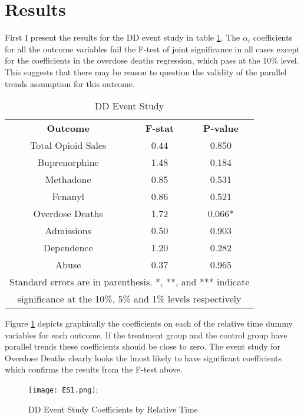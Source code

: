 \documentclass[11pt]{article}
\begin{document}
\section{Results}

First I present the results for the DD event study in table \ref{DD Event Study}.  The $\alpha_i$ coefficients for all the outcome variables fail the F-test of joint significance in all cases except for the coefficients in the overdose deaths regression, which pass at the 10\% level.  This suggests that there may be reason to question the validity of the parallel trends assumption for this outcome.   

\begin{table}[htb]
\centering
\scriptsize
\caption{DD Event Study} 
\label{DD Event Study}
\begin{tabular}{ccc}
\hline \hline
 \textbf{Outcome} & \textbf{F-stat} & \textbf{P-value} \\
Total Opioid Sales &0.44 & 0.850 \\
Buprenorphine & 1.48 & 0.184 \\
Methadone &0.85 & 0.531\\
Fenanyl  &0.86 & 0.521 \\
Overdose Deaths  &1.72 & 0.066*\\
Admissions  &0.50 & 0.903 \\
Dependence  &1.20 & 0.282 \\
Abuse  &0.37 & 0.965\\
\hline
\multicolumn{3}{c}{\tiny{Standard errors are in parenthesis.  *, **, and *** indicate }} \\
\multicolumn{3}{c}{\tiny{significance at the 10\%, 5\% and 1\% levels respectively}} \\
\hline
\end{tabular}
\end{table}



Figure \ref{ESpic} depicts graphically the coefficients on each of the relative time dummy variables for each outcome.  If the treatment group and the control group have parallel trends these coefficients should be close to zero.  The event study for Overdose Deaths clearly looks the lmost likely to have significant coefficients which confirms the results from the F-test above. 

  \begin{figure}
    \centering    
     \texttt{[image: ES1.png]};
    \caption{DD Event Study Coefficients by Relative Time}
    \label{ESpic}
\end{figure}
  
\end{document}
